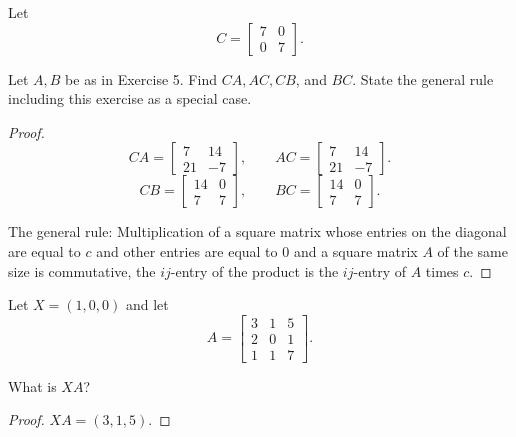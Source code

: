 \begin{exercise}
    Let
    \[
        C = \begin{bmatrix}
            7 & 0 \\
            0 & 7
        \end{bmatrix}.
    \]

    Let $A, B$ be as in Exercise 5. Find $CA, AC, CB$, and $BC$. State the general rule including this exercise as a special case.
\end{exercise}

\begin{proof}
    \[
        CA = \begin{bmatrix}
            7  & 14 \\
            21 & -7
        \end{bmatrix},\qquad
        AC = \begin{bmatrix}
            7  & 14 \\
            21 & -7
        \end{bmatrix}.
    \]
    \[
        CB = \begin{bmatrix}
            14 & 0 \\
            7  & 7
        \end{bmatrix},\qquad
        BC = \begin{bmatrix}
            14 & 0 \\
            7  & 7
        \end{bmatrix}.
    \]

    The general rule: Multiplication of a square matrix whose entries on the diagonal are equal to $c$ and other entries are equal to $0$ and a square matrix $A$ of the same size is commutative, the $ij$-entry of the product is the $ij$-entry of $A$ times $c$.
\end{proof}

\begin{exercise}
    Let $X = (1, 0, 0)$ and let
    \[
        A = \begin{bmatrix}
            3 & 1 & 5 \\
            2 & 0 & 1 \\
            1 & 1 & 7
        \end{bmatrix}.
    \]

    What is $XA$?
\end{exercise}

\begin{proof}
    $XA = (3, 1, 5)$.
\end{proof}

